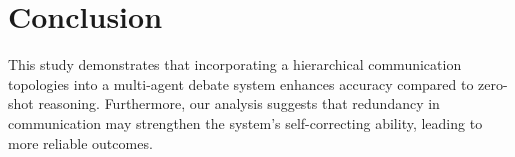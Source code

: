 \section{Conclusion}
\label{sec:conclusion}

This study demonstrates that incorporating a hierarchical communication topologies into a multi-agent debate system enhances accuracy compared to zero-shot reasoning. Furthermore, our analysis suggests that redundancy in communication may strengthen the system’s self-correcting ability, leading to more reliable outcomes.
